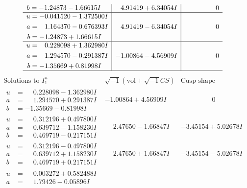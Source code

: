 \documentclass[1p]{elsarticle_modified}
\theoremstyle{definition}
\newcommand{\I}{\sqrt{-1}}
\begin{document}
$$\begin{array}{c|c|c}
\begin{aligned}
b &= -1.24873 - 1.66615 I\end{aligned}
 & \phantom{-}4.91419 + 6.34054 I & \phantom{-0.000000 } 0 \\ \hline\begin{aligned}
u &= -0.041520 - 1.372500 I \\
a &= \phantom{-}1.164370 - 0.676393 I \\
b &= -1.24873 + 1.66615 I\end{aligned}
 & \phantom{-}4.91419 - 6.34054 I & \phantom{-0.000000 } 0 \\ \hline\begin{aligned}
u &= \phantom{-}0.228098 + 1.362980 I \\
a &= \phantom{-}1.294570 - 0.291387 I \\
b &= -1.35669 + 0.81998 I\end{aligned}
 & -1.00864 - 4.56909 I & \phantom{-0.000000 } 0\\
 \hline 
 \end{array}$$\newpage$$\begin{array}{c|c|c}  
\text{Solutions to }I^u_{1}& \I (\text{vol} + \sqrt{-1}CS) & \text{Cusp shape}\\
 \hline 
\begin{aligned}
u &= \phantom{-}0.228098 - 1.362980 I \\
a &= \phantom{-}1.294570 + 0.291387 I \\
b &= -1.35669 - 0.81998 I\end{aligned}
 & -1.00864 + 4.56909 I & \phantom{-0.000000 } 0 \\ \hline\begin{aligned}
u &= \phantom{-}0.312196 + 0.497800 I \\
a &= \phantom{-}0.639712 - 1.158230 I \\
b &= \phantom{-}0.469719 - 0.217151 I\end{aligned}
 & \phantom{-}2.47650 - 1.66847 I & -3.45154 + 5.02678 I \\ \hline\begin{aligned}
u &= \phantom{-}0.312196 - 0.497800 I \\
a &= \phantom{-}0.639712 + 1.158230 I \\
b &= \phantom{-}0.469719 + 0.217151 I\end{aligned}
 & \phantom{-}2.47650 + 1.66847 I & -3.45154 - 5.02678 I \\ \hline\begin{aligned}
u &= \phantom{-}0.003272 + 0.582488 I \\
a &= \phantom{-}1.79426 - 0.05896 I \\

\end{aligned}
\end{array}$$
\end{document}
